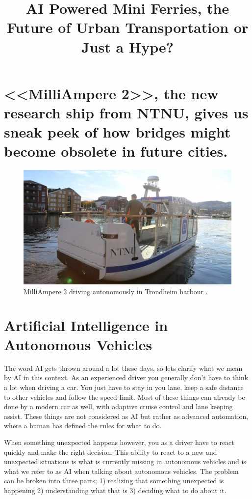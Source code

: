 \documentclass{iopconfser}
\begin{document}
 

\title{AI Powered Mini Ferries, the Future of Urban Transportation or Just a Hype?}

\section*{<<MilliAmpere 2>>, the new research ship from NTNU, gives us sneak peek of how bridges might become obsolete in future cities.}

\begin{figure}[H]
    \centering
    \includegraphics[width=\textwidth]{figures/milliampere.jpg}
    \caption{MilliAmpere 2 driving autonomously in Trondheim harbour \cite{hauglandDetSomHar2022}.}
\end{figure}

\section*{Artificial Intelligence in Autonomous Vehicles}
The word AI gets thrown around a lot these days, so lets clarify what we mean by AI in this context.
As an experienced driver you generally don't have to think a lot when driving a car.
You just have to stay in you lane, keep a safe distance to other vehicles and follow the speed limit.
Most of these things can already be done by a modern car as well, with adaptive cruise control and lane keeping assist.
These things are not considered as AI but rather as advanced automation, where a human has defined the rules for what to do.

When something unexpected happens however, you as a driver have to react quickly and make the right decision.
This ability to react to a new and unexpected situations is what is currently missing in autonomous vehicles and is what we refer to as AI when talking about autonomous vehicles.
The problem can be broken into three parts; 1) realizing that something unexpected is happening 2) understanding what that is 3) deciding what to do about it.
\end{document}
